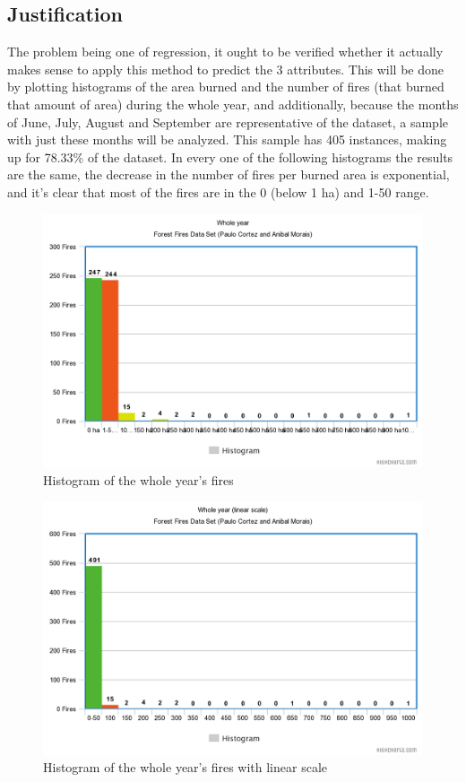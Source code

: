 \documentclass[runningheads]{llncs}
\begin{document}
\subsection{Justification}
The problem being one of regression, it ought to be verified whether it actually makes sense to apply this method to predict the 3 attributes.
This will be done by plotting histograms of the area burned and the number of fires (that burned that amount of area) during the whole year, and additionally, because the months of June, July, August and September are representative of the dataset, a sample with just these months will be analyzed. This sample has 405 instances, making up for 78.33\% of the dataset.
In every one of the following histograms the results are the same, the decrease in the number of fires per burned area is exponential, and it's clear that most of the fires are in the 0 (below 1 ha) and 1-50 range.
\
\begin{figure}
    \caption{Histogram of the whole year's fires}\label{hist1}
    \centerline{\includegraphics[width=1\columnwidth]{imagens/WholeYear.png}}
    \label{WholeY}
\end{figure} 
\begin{figure}
    \caption{Histogram of the whole year's fires with linear scale}\label{hist2}
    \centerline{\includegraphics[width=1\columnwidth]{imagens/WholeYearLinear.png}}
    \label{WholeYL}
\end{figure}
\end{document}
